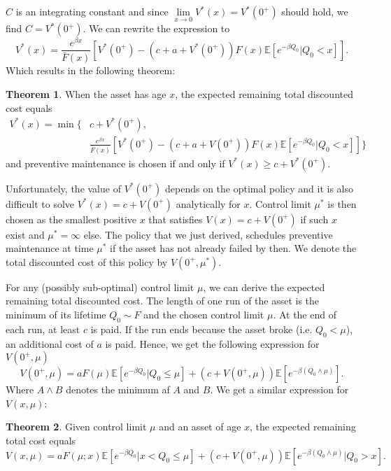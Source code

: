 \documentclass[a4paper]{thesis}
\theoremstyle{definition}
\newtheorem{theorem}{Theorem}[chapter]
\begin{document}
$C$ is an integrating constant and since $\lim\limits_{x\rightarrow 0}V^*(x)=V^*(0^+)$ should hold, we find $C=V^*(0^+)$.
We can rewrite the expression to
$$
V^*(x)=\frac{e^{\beta x}}{\bar F(x)} [V^*(0^+)  - (c+a+V^*(0^+))F(x)\mathbb{E}[e^{-\beta Q_0}|Q_0<x]].
$$
Which results in the following theorem:
\begin{theorem}
	When the asset has age $x$, the expected remaining total discounted cost equals
	\begin{equation}\label{eq:AgeBasedSolvedBellman}
	\begin{split}
	V^*(x)=\min\{&c+V^*(0^+),\\
	&\frac{ e^{\beta x}}{\bar F(x)} [V^*(0^+) - (c+a+V(0^+))F(x)\mathbb{E}[e^{-\beta Q_0}|Q_0<x]]
	\}
	\end{split}
	\end{equation}
	and preventive maintenance is chosen if and only if $V^*(x)\geq c+V^*(0^+)$.
\end{theorem}
Unfortunately, the value of $V^*(0^+)$ depends on the optimal policy and it is also difficult to solve $V^*(x)=c+V(0^+)$ analytically for $x$.
Control limit $\mu^*$ is then chosen as the smallest positive $x$ that satisfies $V(x)=c+V(0^+)$ if such $x$ exist and $\mu^*=\infty$ else.
The policy that we just derived, schedules preventive maintenance at time $\mu^*$ if the asset has not already failed by then.
We denote the total discounted cost of this policy by $V(0^+,\mu^*)$.

For any (possibly sub-optimal) control limit $\mu$, we can derive the expected remaining total discounted cost.
The length of one run of the asset is the minimum of its lifetime $Q_0\sim F$ and the chosen control limit $\mu$.
At the end of each run, at least $c$ is paid.
If the run ends because the asset broke (i.e. $Q_0<\mu$), an additional cost of $a$ is paid.
Hence, we get the following expression for $V(0^+,\mu)$
\begin{equation}\label{eq:AgeBasedPolicyTDC}
V(0^+,\mu)=aF(\mu)\mathbb{E}[e^{-\beta Q_0}|Q_0\leq \mu]+(c+V(0^+,\mu))\mathbb{E}[e^{-\beta(Q_0\wedge\mu)}].
\end{equation}
Where $A\wedge B$ denotes the minimum af $A$ and $B$.
We get a similar expression for $V(x,\mu)$:

\begin{theorem}
	Given control limit $\mu$ and an asset of age $x$, the expected remaining total cost equals 
	\begin{equation}\label{eq:AgeBasedPolicyRemainingTDC}
	V(x,\mu)=aF(\mu;x)\mathbb{E}[e^{-\beta Q_0}|x<Q_0\leq \mu]+(c+V(0^+,\mu))\mathbb{E}[e^{-\beta(Q_0\wedge\mu)}|Q_0>x].
	\end{equation}
\end{theorem}
\end{document}

